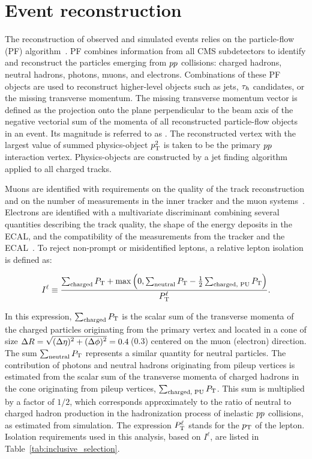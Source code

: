 \section{Event reconstruction}
\label{sec:reconstruction}

The reconstruction of observed and simulated events relies on the 
particle-flow (PF) algorithm~\cite{Sirunyan:2017ulk}. PF combines 
information from all CMS subdetectors to identify
and reconstruct the particles emerging from $pp$ collisions:
charged hadrons, neutral hadrons, photons, muons, and electrons.
Combinations of these PF objects are used to reconstruct
higher-level objects such as jets, $\tau_{h}$ candidates, or
the missing transverse momentum.
The missing transverse momentum vector \etvecmiss is defined as 
the projection onto the plane perpendicular to the beam axis of the 
negative vectorial sum of the momenta of all reconstructed particle-flow 
objects in an event. Its magnitude is referred to as \ptmiss.
The reconstructed vertex with the largest value of summed physics-object 
$p_\mathrm{T}^2$ is taken to be the primary $pp$ interaction vertex. 
Physics-objects are constructed by a jet finding 
algorithm~\cite{Cacciari:2008gp,Cacciari:2011ma} applied to all charged 
tracks.

Muons are identified with requirements on the quality of
the track reconstruction and on the number of measurements in the
inner tracker and the muon systems~\cite{Chatrchyan:2012xi}.
Electrons are identified with a multivariate discriminant
combining several quantities describing the track quality,
the shape of the energy deposits in the ECAL,
and the compatibility of the measurements from the tracker and the
ECAL~\cite{Khachatryan:2015hwa}.
To reject non-prompt or misidentified leptons, a relative lepton isolation is defined as:

\begin{equation}
I^{\ell} \equiv \frac{\sum_\text{charged}  P_\mathrm{T} + \max\left( 0, \sum_\text{neutral}  P_\mathrm{T}
                 - \frac{1}{2} \sum_\text{charged, PU} P_\mathrm{T}  \right )}{P_\mathrm{T}^{\ell}}.
\label{eq:reconstruction_isolation}
\end{equation}

In this expression, $\sum_\text{charged}  P_\mathrm{T}$ is the scalar sum of the
transverse momenta of the charged particles originating from
the primary vertex and located in a cone of size
$\Delta R = \sqrt{\smash[b]{(\Delta \eta)^2 + (\Delta \phi)^2}} = 0.4$\,(0.3)
centered on the muon (electron) direction. The sum
$\sum_\text{neutral}  P_\mathrm{T}$  represents
a similar quantity for neutral particles.
The contribution of photons and neutral hadrons originating from pileup 
vertices is estimated from the scalar sum of the transverse
momenta of charged hadrons in the cone originating from pileup vertices,
$\sum_\text{charged, PU} P_\mathrm{T}$. This sum is multiplied by a factor of
$1/2$, which corresponds approximately to the ratio of neutral to charged
hadron production in the hadronization process
of inelastic $pp$ collisions, as estimated from simulation.
The expression $P_\mathrm{T}^{\ell}$ stands for the $p_\mathrm{T}$ of the lepton. Isolation 
requirements   used in this analysis, based on $I^{\ell}$, are listed 
in Table~\ref{tab:inclusive_selection}.

